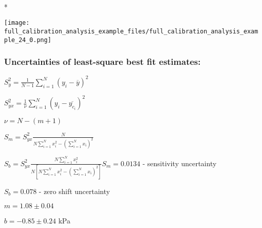 \documentclass[letterpaper,10pt,english]{/Users/alex/anaconda/lib/python2.7/site-packages/sphinx/texinputs/sphinxhowto}
\def\smaller{\fontsize{9.5pt}{9.5pt}\selectfont}
\newenvironment{InvisibleVerbatim}
        {\begin{mdframed}[leftmargin=0.1\linewidth,innerleftmargin=3pt,innerrightmargin=3pt, userdefinedwidth=1\linewidth, linewidth=0pt, linecolor=white, usetwoside=false]}
        {\end{mdframed}}
\begin{document}
                \makebox[0.1\linewidth]{\smaller\hfill\tt\color{nbframe-out-prompt}Out\hspace{4pt}{[}68{]}:\hspace{4pt}}\\*
                \vspace{-2.55\baselineskip}\begin{InvisibleVerbatim}
                \vspace{-0.5\baselineskip}
    \begin{center}
    \texttt{[image: full\_calibration\_analysis\_example\_files/full\_calibration\_analysis\_example\_24\_0.png]}
    \par
    \end{center}
    
            \end{InvisibleVerbatim}
            
        
    
\subsubsection{Uncertainties of least-square best fit
estimates:}\label{uncertainties-of-least-square-best-fit-estimates}

$S_y^2 = \frac{1}{N-1} \sum\limits_{i=1}^N (y_i - \overline{y})^2$

$S_{yx}^2 = \frac{1}{\nu} \sum\limits_{i=1}^N (y_i - \overline{y_{c_i}})^2$

$\nu = N - (m+1)$

$S_m = S_{yx}^2 \frac{N}{N\sum\limits_{i=1}^N x_i^2 - \left( \sum\limits_{i=1}^N x_i \right)^2}$

$S_b = S_{yx}^2 \frac{N\sum\limits_{i=1}^N x_i^2}{N \left[N\sum\limits_{i=1}^N x_i^2 - \left( \sum\limits_{i=1}^N x_i \right)^2 \right]}$$S_m = 0.0134$ - sensitivity uncertainty

$S_b = 0.078$ - zero shift uncertainty

$m = 1.08 \pm 0.04$

$b = -0.85 \pm 0.24$ kPa
        

        \renewcommand{\indexname}{Index}
        \printindex

    
\end{document}
